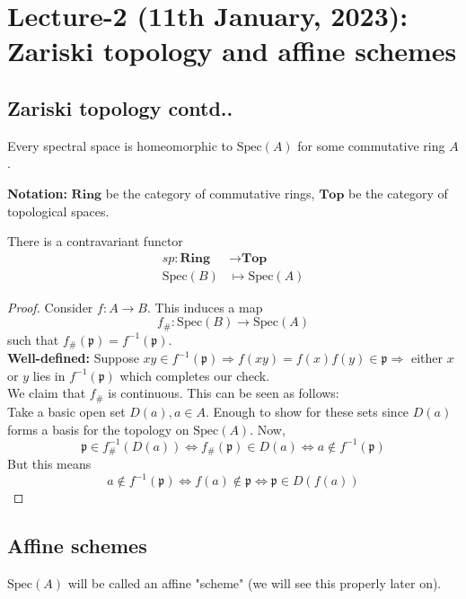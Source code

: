 \documentclass[oneside, 12pt]{scrbook}
\newcommand{\spec}{\mathrm{Spec}}
\newcommand{\pr}{\mathfrak{p}}
\theoremstyle{theorem}
\begin{document}
\chapter{Lecture-2 (11th January, 2023): Zariski topology and affine schemes}

\section{Zariski topology contd..}

\begin{theorem}[Hochster]
Every spectral space is homeomorphic to $\spec(A)$ for some commutative ring $A$.
\end{theorem}

\textbf{Notation:} $\mathrm{\textbf{Ring}}$ be the category of commutative rings, $\mathrm{\textbf{Top}}$ be the category of topological spaces.

\begin{theorem}
There is a contravariant functor 
\begin{align*}
sp: \mathrm{\textbf{Ring}} &\rightarrow \mathrm{\textbf{Top}} \\
\spec(B) &\mapsto \spec(A)
\end{align*}
\end{theorem}

\begin{proof}
Consider $f: A \rightarrow B$. This induces a map $$f_{\#} : \spec(B) \rightarrow \spec(A)$$ such that $f_{\#}(\pr) = f^{-1}(\pr)$. \\
\textbf{Well-defined:} Suppose $xy \in f^{-1}(\pr) \Rightarrow f(xy) = f(x)f(y) \in \pr \Rightarrow$ either $x$ or $y$ lies in $f^{-1}(\pr)$ which completes our check. \\
We claim that $f_{\#}$ is continuous. This can be seen as follows: \\
Take a basic open set $D(a), a\in A$. Enough to show for these sets since $D(a)$ forms a basis for the topology on $\spec(A)$. Now, $$\pr \in f_{\#}^{-1}(D(a))\Leftrightarrow f_{\#}(\pr) \in D(a) \Leftrightarrow a \not \in f^{-1}(\pr)$$ But this means $$a \not \in f^{-1}(\pr) \Leftrightarrow f(a) \not \in \pr \Leftrightarrow \pr \in D(f(a))$$
\end{proof}

\section{Affine schemes}

\begin{definition}
$\spec(A)$ will be called an affine "scheme" (we will see this properly later on).
\end{definition}
\end{document}
